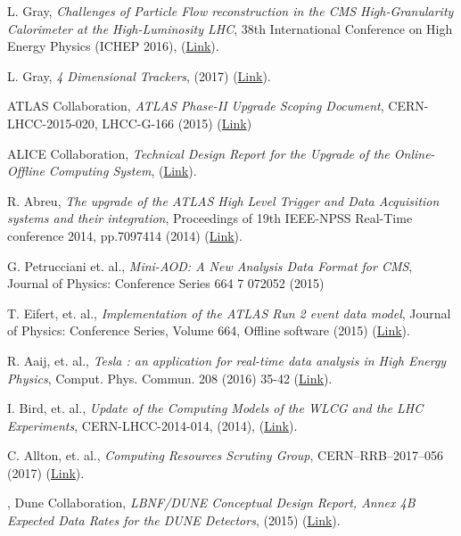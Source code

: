 \documentclass[11pt,letterpaper,fleqn]{article}
\begin{document}
\begin{thebibliography}{99}
L. Gray, 
\textit{Challenges of Particle Flow reconstruction in the CMS High-Granularity Calorimeter at the High-Luminosity LHC}, 
38th International Conference on High Energy Physics (ICHEP 2016), (\href{https://indico.cern.ch/event/432527/contributions/1071751/}{Link}). 

L. Gray, 
\textit{4 Dimensional Trackers},
(2017) (\href{https://indico.cern.ch/event/577003/contributions/2476434}{Link}).

ATLAS Collaboration, 
\textit{ATLAS Phase-II Upgrade Scoping Document}, 
CERN-LHCC-2015-020, LHCC-G-166 (2015) (\href{https://cds.cern.ch/record/2055248}{Link})

ALICE Collaboration, 
\textit{Technical Design Report for the Upgrade of the Online-Offline Computing System}, 
(\href{https://cds.cern.ch/record/2011297}{Link}).

R. Abreu, 
\textit{The upgrade of the ATLAS High Level Trigger and Data Acquisition systems and their integration}, 
Proceedings of 19th IEEE-NPSS Real-Time conference 2014, pp.7097414 (2014) (\href{https://cds.cern.ch/record/1702466/}{Link}). 

G. Petrucciani et. al., 
\textit{Mini-AOD: A New Analysis Data Format for CMS}, Journal of Physics: Conference Series 664 7 072052 (2015) 

T. Eifert, et. al., 
\textit{Implementation of the ATLAS Run 2 event data model}, 
Journal of Physics: Conference Series, Volume 664, Offline software (2015) (\href{http://iopscience.iop.org/article/10.1088/1742-6596/664/7/072045}{Link}).

R. Aaij, et. al., 
\textit{Tesla : an application for real-time data analysis in High Energy Physics}, 
Comput. Phys. Commun. 208 (2016) 35-42 (\href{https://cds.cern.ch/record/2147693}{Link}).

I. Bird, et. al., 
\textit{Update of the Computing Models of the WLCG and the LHC Experiments},
CERN-LHCC-2014-014, (2014), (\href{http://cds.cern.ch/record/1695401/files/LCG-TDR-002.pdf}{Link}).

C. Allton, et. al.,  
\textit{Computing Resources Scrutiny Group}, 
CERN–RRB–2017–056 (2017) (\href{https://indico.cern.ch/event/617821/.../CERN-RRB-2017-056\_V2.pdf}{Link}). 

, 
Dune Collaboration, 
\textit{LBNF/DUNE Conceptual Design Report, Annex 4B Expected Data Rates for the DUNE Detectors}, 
(2015) (\href{http://lbne2-docdb.fnal.gov/cgi-bin/ShowDocument?docid=10720}{Link}). 


\end{thebibliography}
\end{document}
